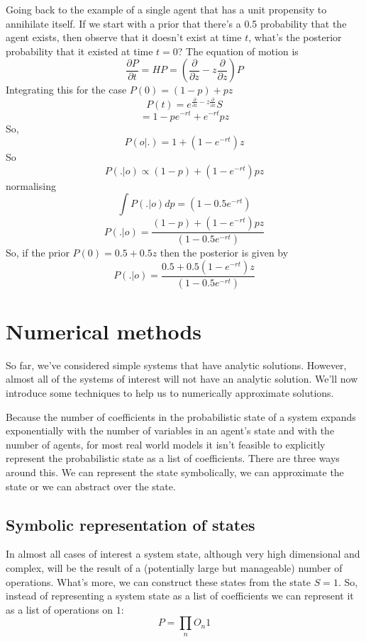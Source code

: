 \documentclass[letterpaper,twocolumn,10pt]{article}
\begin{document}
Going back to the example of a single agent that has a unit propensity to annihilate itself. If we start with a prior that there's a 0.5 probability that the agent exists, then observe that it doesn't exist at time $t$, what's the posterior probability that it existed at time $t=0$? The equation of motion is
\[
\frac{\partial P}{\partial t} = HP = \left(\frac{\partial}{\partial z} - z \frac{\partial }{\partial z}\right)P
\]
Integrating this for the case $P(0) = (1-p) + pz$
\[
P(t) = e^{\frac{\partial}{\partial z} - z \frac{\partial }{\partial z}}S
\]
\[
= 1-pe^{-rt} + e^{-rt}pz
\]
So,
\[
P(o|.) = 1 + (1-e^{-rt})z
\]
So
\[
P(.|o) \propto (1-p) + (1-e^{-rt})pz
\]
normalising
\[
\int P(.|o) dp = (1-0.5e^{-rt})
\]
\[
P(.|o) = \frac{(1-p) + (1-e^{-rt})pz}{(1-0.5e^{-rt})}
\]
So, if the prior $P(0) = 0.5 + 0.5z$ then the posterior is given by
\[
P(.|o) = \frac{0.5 + 0.5(1-e^{-rt})z}{(1-0.5e^{-rt})}
\]

\section{Numerical methods}

So far, we've considered simple systems that have analytic solutions. However, almost all of the systems of interest will not have an analytic solution. We'll now introduce some techniques to help us to numerically approximate solutions.

Because the number of coefficients in the probabilistic state of a system expands exponentially with the number of variables in an agent's state and with the number of agents, for most real world models it isn't feasible to explicitly represent the probabilistic state as a list of coefficients. There are three ways around this. We can represent the state symbolically, we can approximate the state or we can abstract over the state.

\subsection{Symbolic representation of states}

In almost all cases of interest a system state, although very high dimensional and complex, will be the result of a (potentially large but manageable) number of operations. What's more, we can construct these states from the state $S=1$. So, instead of representing a system state as a list of coefficients we can represent it as a list of operations on $1$:
\[
P = \prod_n O_n1
\]
\end{document}
